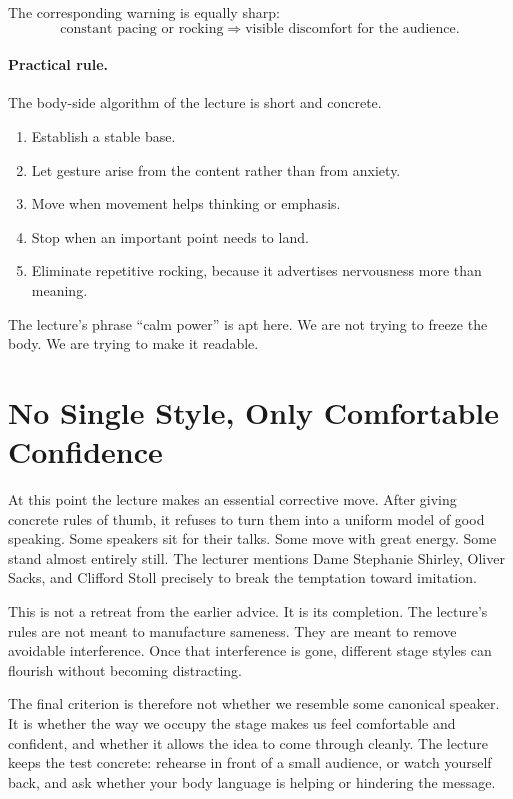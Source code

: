 The corresponding warning is equally sharp:
\begin{equation}
\text{constant pacing or rocking} \Longrightarrow \text{visible discomfort for the audience}.
\end{equation}

\paragraph{Practical rule.} The body-side algorithm of the lecture is short and concrete.
\begin{enumerate}
\item Establish a stable base.
\item Let gesture arise from the content rather than from anxiety.
\item Move when movement helps thinking or emphasis.
\item Stop when an important point needs to land.
\item Eliminate repetitive rocking, because it advertises nervousness more than meaning.
\end{enumerate}

The lecture's phrase ``calm power'' is apt here. We are not trying to freeze the body. We are trying to make it readable.

\section{No Single Style, Only Comfortable Confidence}

At this point the lecture makes an essential corrective move. After giving concrete rules of thumb, it refuses to turn them into a uniform model of good speaking. Some speakers sit for their talks. Some move with great energy. Some stand almost entirely still. The lecturer mentions Dame Stephanie Shirley, Oliver Sacks, and Clifford Stoll precisely to break the temptation toward imitation.

This is not a retreat from the earlier advice. It is its completion. The lecture's rules are not meant to manufacture sameness. They are meant to remove avoidable interference. Once that interference is gone, different stage styles can flourish without becoming distracting.

The final criterion is therefore not whether we resemble some canonical speaker. It is whether the way we occupy the stage makes us feel comfortable and confident, and whether it allows the idea to come through cleanly. The lecture keeps the test concrete: rehearse in front of a small audience, or watch yourself back, and ask whether your body language is helping or hindering the message.

